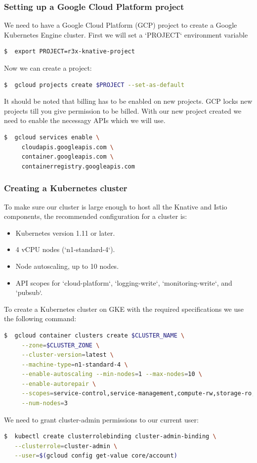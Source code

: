 \subsubsection{Setting up a Google Cloud Platform project}
We need to have a Google Cloud Platform (GCP) project to create a Google Kubernetes
Engine cluster. First we will set a `PROJECT` environment variable
\begin{lstlisting}[language=bash]
  $  export PROJECT=r3x-knative-project
\end{lstlisting}
Now we can create a project:
\begin{lstlisting}[language=bash]
  $  gcloud projects create $PROJECT --set-as-default
\end{lstlisting}
It should be noted that billing has to be enabled on new projects. GCP locks new projects till you give permission to be billed. With our new project created we need to enable the necessagy APIs which we will use.
\begin{lstlisting}[language=bash]
  $  gcloud services enable \
     cloudapis.googleapis.com \
     container.googleapis.com \
     containerregistry.googleapis.com
\end{lstlisting}

\subsubsection{Creating a Kubernetes cluster}
To make sure our cluster is large enough to host all the Knative and Istio
components, the recommended configuration for a cluster is:
\begin{itemize}
    \item Kubernetes version 1.11 or later.
    \item 4 vCPU nodes (`n1-standard-4`).
    \item Node autoscaling, up to 10 nodes.
    \item API scopes for `cloud-platform`, `logging-write`, `monitoring-write`, and
  `pubsub`.
\end{itemize}
To create a Kubernetes cluster on GKE with the required specifications we use the following command:
\begin{lstlisting}[language=bash]
  $  gcloud container clusters create $CLUSTER_NAME \
     --zone=$CLUSTER_ZONE \
     --cluster-version=latest \
     --machine-type=n1-standard-4 \
     --enable-autoscaling --min-nodes=1 --max-nodes=10 \
     --enable-autorepair \
     --scopes=service-control,service-management,compute-rw,storage-ro,cloud-platform,logging-write,monitoring-write,pubsub,datastore \
     --num-nodes=3
\end{lstlisting}
We need to grant cluster-admin permissions to our current user:
\begin{lstlisting}[language=bash]
  $  kubectl create clusterrolebinding cluster-admin-binding \
   --clusterrole=cluster-admin \
   --user=$(gcloud config get-value core/account)
\end{lstlisting}
  
